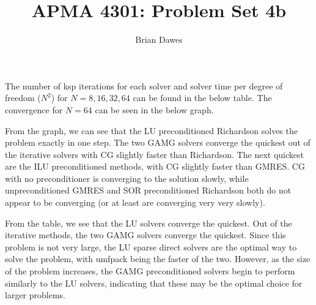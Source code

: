 \documentclass{article}\usepackage[T1]{fontenc}
\begin{document}
\title{APMA 4301: Problem Set 4b}
\author{Brian Dawes}
\maketitle

The number of ksp iterations for each solver and solver time per degree of freedom ($N^2$) for $N=8,16,32,64$ can be found in the below table. The convergence for $N=64$ can be seen in the below graph.

From the graph, we can see that the LU preconditioned Richardson solves the problem exactly in one step. The two GAMG solvers converge the quickest out of the iterative solvers with CG slightly faster than Richardson. The next quickest are the ILU preconditioned methods, with CG slightly faster than GMRES. CG with no preconditioner is converging to the solution slowly, while unpreconditioned GMRES and SOR preconditioned Richardson both do not appear to be converging (or at least are converging very very slowly).

From the table, we see that the LU solvers converge the quickest. Out of the iterative methods, the two GAMG solvers converge the quickest. Since this problem is not very large, the LU sparse direct solvers are the optimal way to solve the problem, with umfpack being the faster of the two. However, as the size of the problem increases, the GAMG preconditioned solvers begin to perform similarly to the LU solvers, indicating that these may be the optimal choice for larger problems.
 
\end{document}
